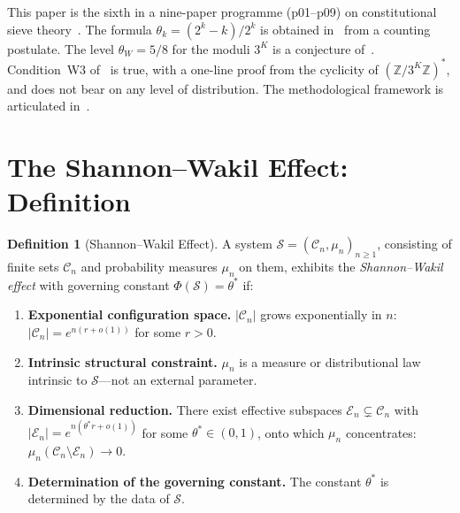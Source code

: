 \documentclass[12pt]{amsart}
\theoremstyle{plain}
\theoremstyle{definition}
\newtheorem{definition}[theorem]{Definition}
\theoremstyle{remark}
\newcommand{\Z}{\mathbb{Z}}
\newcommand{\thetaW}{\theta_W}
\begin{document}
This paper is the sixth in a nine-paper programme (p01--p09) on constitutional
sieve
theory~\cite{WakilCF,WakilKhayyam,WakilSC,WakilEisenstein,WakilRamanujan,WakilW3}.
The formula $\theta_k = (2^k - k)/2^k$ is obtained in~\cite{WakilCF,WakilRamanujan}
from a counting postulate. The level $\thetaW = 5/8$ for the moduli $3^K$ is a
conjecture of~\cite{WakilEisenstein}. Condition~W3 of~\cite{WakilW3} is true,
with a one-line proof from the cyclicity of $(\Z/3^K\Z)^*$, and does not bear on
any level of distribution. The methodological framework is articulated
in~\cite{WakilSC}.

\section{The Shannon--Wakil Effect: Definition}

\begin{definition}[Shannon--Wakil Effect]
\label{def:sw}
A system $\mathcal{S} = (\mathcal{C}_n, \mu_n)_{n \geq 1}$, consisting of finite
sets $\mathcal{C}_n$ and probability measures $\mu_n$ on them, exhibits the
\emph{Shannon--Wakil effect} with governing constant $\Phi(\mathcal{S}) =
\theta^*$ if:
\begin{enumerate}[label=(SW\arabic*)]
  \item \textbf{Exponential configuration space.} $|\mathcal{C}_n|$ grows
    exponentially in $n$: $|\mathcal{C}_n| = e^{n(r + o(1))}$ for some $r > 0$.

  \item \textbf{Intrinsic structural constraint.} $\mu_n$ is a measure or
    distributional law intrinsic to $\mathcal{S}$---not an external parameter.

  \item \textbf{Dimensional reduction.} There exist effective subspaces
    $\mathcal{E}_n \subsetneq \mathcal{C}_n$ with $|\mathcal{E}_n| = e^{n(\theta^* r
    + o(1))}$ for some $\theta^* \in (0,1)$, onto which $\mu_n$ concentrates:
    $\mu_n(\mathcal{C}_n \setminus \mathcal{E}_n) \to 0$.

  \item \textbf{Determination of the governing constant.} The constant $\theta^*$
    is determined by the data of $\mathcal{S}$.
\end{enumerate}
\end{definition}
\end{document}
